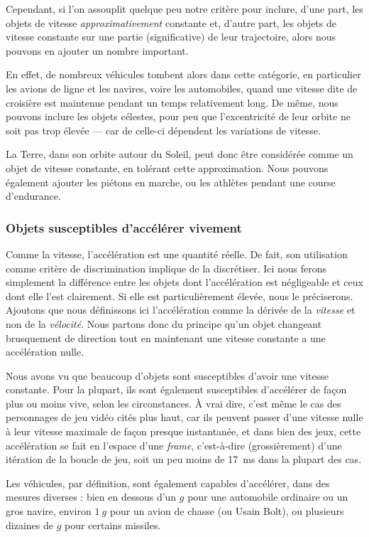 	Cependant, si l'on assouplit quelque peu notre critère pour inclure, d'une part, les objets de vitesse \emph{approximativement} constante et, d'autre part, les objets de vitesse constante sur une partie (significative) de leur trajectoire, alors nous pouvons en ajouter un nombre important.
	
	En effet, de nombreux véhicules tombent alors dans cette catégorie, en particulier les avions de ligne et les navires, voire les automobiles, quand une vitesse dite de croisière est maintenue pendant un temps relativement long. De même, nous pouvons inclure les objets célestes, pour peu que l'excentricité de leur orbite ne soit pas trop élevée --- car de celle-ci dépendent les variations de vitesse.
	
	La Terre, dans son orbite autour du Soleil, peut donc être considérée comme un objet de vitesse constante, en tolérant cette approximation. Nous pouvons également ajouter les piétons en marche, ou les athlètes pendant une course d'endurance.
	
	\subsubsection{Objets susceptibles d'accélérer vivement}
	Comme la vitesse, l'accélération est une quantité réelle. De fait, son utilisation comme critère de discrimination implique de la discrétiser. Ici nous ferons simplement la différence entre les objets dont l'accélération est négligeable et ceux dont elle l'est clairement. Si elle est particulièrement élevée, nous le préciserons. Ajoutons que nous définissons ici l'accélération comme la dérivée de la \emph{vitesse} et non de la \emph{vélocité}. Nous partons donc du principe qu'un objet changeant brusquement de direction tout en maintenant une vitesse constante a une \og accélération \fg{} nulle.
	
	Nous avons vu que beaucoup d'objets sont susceptibles d'avoir une vitesse constante. Pour la plupart, ils sont également susceptibles d'accélérer de façon plus ou moins vive, selon les circonstances. À vrai dire, c'est même le cas des personnages de jeu vidéo cités plus haut, car ils peuvent passer d'une vitesse nulle à leur vitesse maximale de façon presque instantanée, et dans bien des jeux, cette accélération se fait en l'espace d'une \emph{frame}, c'est-à-dire (grossièrement) d'une itération de la boucle de jeu, soit un peu moins de 17~ms dans la plupart des cas.
	
	Les véhicules, par définition, sont également capables d'accélérer, dans des mesures diverses : bien en dessous d'un $g$ pour une automobile ordinaire ou un gros navire, environ $1~g$ pour un avion de chasse (ou Usain Bolt\footnotemark{}), ou plusieurs dizaines de $g$ pour certains missiles\footnotemark{}.
	
